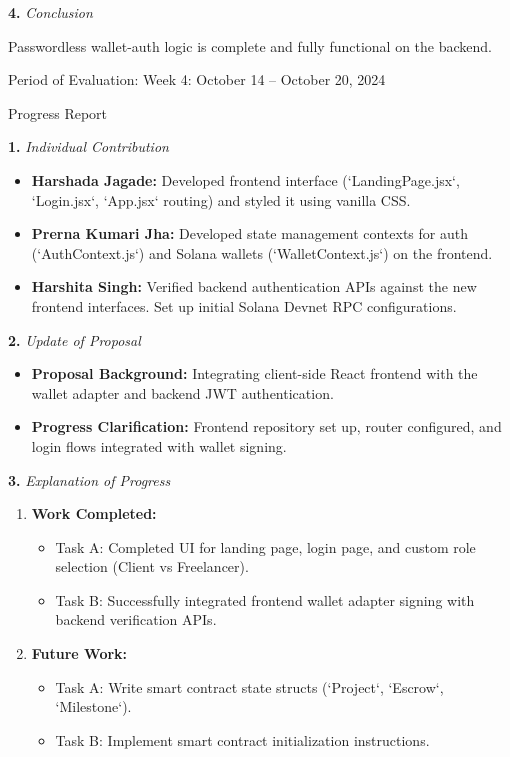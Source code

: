 \documentclass[12pt]{article}
\newcommand{\phasetitle}[1]{{\large Period of Evaluation: #1}\par\vspace{4pt}}
\newcommand{\progressreport}{{\large Progress Report}\par\vspace{4pt}}
\newcommand{\subhead}[2]{\textbf{#1.} \textit{#2}\par}
\begin{document}
\subhead{4}{Conclusion}
Passwordless wallet-auth logic is complete and fully functional on the backend.

\newpage

\phasetitle{Week 4: October 14 -- October 20, 2024}

\progressreport

\subhead{1}{Individual Contribution}
\begin{itemize}[leftmargin=2em]
    \item \textbf{Harshada Jagade:} Developed frontend interface (`LandingPage.jsx`, `Login.jsx`, `App.jsx` routing) and styled it using vanilla CSS.
    \item \textbf{Prerna Kumari Jha:} Developed state management contexts for auth (`AuthContext.js`) and Solana wallets (`WalletContext.js`) on the frontend.
    \item \textbf{Harshita Singh:} Verified backend authentication APIs against the new frontend interfaces. Set up initial Solana Devnet RPC configurations.
\end{itemize}

\subhead{2}{Update of Proposal}
\begin{itemize}[leftmargin=2em]
    \item \textbf{Proposal Background:} Integrating client-side React frontend with the wallet adapter and backend JWT authentication.
    \item \textbf{Progress Clarification:} Frontend repository set up, router configured, and login flows integrated with wallet signing.
\end{itemize}

\newpage

\subhead{3}{Explanation of Progress}
\begin{enumerate}[leftmargin=2em]
    \item \textbf{Work Completed:}
    \begin{itemize}[leftmargin=2em]
        \item Task A: Completed UI for landing page, login page, and custom role selection (Client vs Freelancer).
        \item Task B: Successfully integrated frontend wallet adapter signing with backend verification APIs.
    \end{itemize}
    \item \textbf{Future Work:}
    \begin{itemize}[leftmargin=2em]
        \item Task A: Write smart contract state structs (`Project`, `Escrow`, `Milestone`).
        \item Task B: Implement smart contract initialization instructions.
    \end{itemize}
\end{enumerate}
\end{document}
